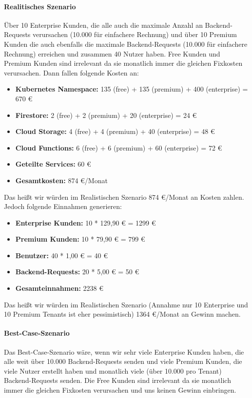 \paragraph{Realitisches Szenario}
Über 10 Enterprise Kunden, die alle auch die maximale Anzahl an Backend-Requests verursachen (10.000 für einfachere Rechnung) und über 10 Premium Kunden die auch ebenfalls die maximale Backend-Requests (10.000 für einfachere Rechnung) erreichen und zusammen 40 Nutzer haben.
Free Kunden und Premium Kunden sind irrelevant da sie monatlich immer die gleichen Fixkosten verursachen.
Dann fallen folgende Kosten an:
\begin{itemize}
	\item \textbf{Kubernetes Namespace:} 135 (free) + 135 (premium) + 400 (enterprise) = 670 €
	\item \textbf{Firestore:} 2 (free) + 2 (premium) + 20 (enterprise) = 24 €
	\item \textbf{Cloud Storage:} 4 (free) + 4 (premium) + 40 (enterprise) = 48 €
	\item \textbf{Cloud Functions:} 6 (free) + 6 (premium) + 60 (enterprise) = 72 €
	\item \textbf{Geteilte Services:} 60 €
	\item \textbf{Gesamtkosten:} 874 €/Monat
\end{itemize}
Das heißt wir würden im Realistischen Szenario 874 €/Monat an Kosten zahlen.
Jedoch folgende Einnahmen generieren:
\begin{itemize}
	\item \textbf{Enterprise Kunden:} 10 * 129,90 € = 1299 €
	\item \textbf{Premium Kunden:} 10 * 79,90 € = 799 €
	\item \textbf{Benutzer:} 40 * 1,00 € = 40 €
	\item \textbf{Backend-Requests:} 20 * 5,00 € = 50 €
	\item \textbf{Gesamteinnahmen:} 2238 €
\end{itemize}

Das heißt wir würden im Realistischen Szenario (Annahme nur 10 Enterprise und 10 Premium Tenants ist eher pessimistisch) 1364 €/Monat an Gewinn machen.

\paragraph{Best-Case-Szenario}
Das Best-Case-Szenario wäre, wenn wir sehr viele Enterprise Kunden haben, die alle weit über 10.000 Backend-Requests senden und viele Premium Kunden, die viele Nutzer erstellt haben und monatlich viele (über 10.000 pro Tenant) Backend-Requests senden.
Die Free Kunden sind irrelevant da sie monatlich immer die gleichen Fixkosten verursachen und uns keinen Gewinn einbringen.
